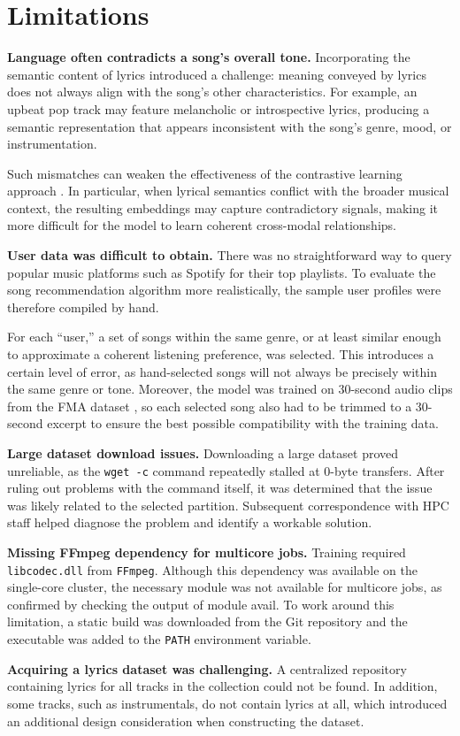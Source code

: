 \section{Limitations}

\textbf{Language often contradicts a song’s overall tone.} Incorporating the semantic content of lyrics introduced a challenge: meaning conveyed by lyrics does not always align with the song’s other characteristics. For example, an upbeat pop track may feature melancholic or introspective lyrics, producing a semantic representation that appears inconsistent with the song’s genre, mood, or instrumentation.

Such mismatches can weaken the effectiveness of the contrastive learning approach \cite{contrastive} \cite{contrastivefusion}. In particular, when lyrical semantics conflict with the broader musical context, the resulting embeddings may capture contradictory signals, making it more difficult for the model to learn coherent cross-modal relationships.

\textbf{User data was difficult to obtain.} There was no
straightforward way to query popular music platforms such as Spotify \cite{spotify} for their top playlists. To evaluate the song recommendation algorithm more realistically, the sample user profiles were therefore compiled by hand.

For each “user,” a set of songs within the same genre, or at least similar enough to approximate a coherent listening preference, was selected. This introduces a certain level of error, as hand-selected songs will not always be precisely within the same genre or tone. Moreover, the model was trained on 30-second audio clips from the FMA dataset \cite{FMA}, so each selected song also had to be trimmed to a 30-second excerpt to ensure the best possible compatibility with the training data.

\textbf{Large dataset download issues.} Downloading a large dataset proved unreliable, as the \texttt{wget -c} command repeatedly stalled at 0-byte transfers. After ruling out problems with the command itself, it was determined that the issue was likely related to the selected partition. Subsequent correspondence with HPC staff helped diagnose the problem and identify a workable solution.

\textbf{Missing FFmpeg dependency for multicore jobs.} Training required \texttt{libcodec.dll} from \texttt{FFmpeg}. Although this dependency was available on the single-core cluster, the necessary module was not available for multicore jobs, as confirmed by checking the output of module avail. To work around this limitation, a static build was downloaded from the Git repository and the executable was added to the \texttt{PATH} environment variable.

\textbf{Acquiring a lyrics dataset was challenging.} A centralized repository containing lyrics for all tracks in the collection could not be found. In addition, some tracks, such as instrumentals, do not contain lyrics at all, which introduced an additional design consideration when constructing the dataset.